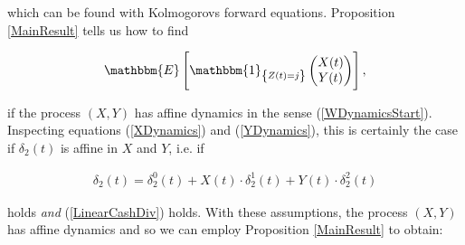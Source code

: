\documentclass{article}
\newcommand{\1}[1]{\mathbbm{1}_{\left\lbrace #1 \right\rbrace}}
\newcommand{\expec}[1][def]{\mathbbm{E} \left[ #1 \right]}
\theoremstyle{break}
\theoremstyle{remark}
\numberwithin{equation}{section}
\begin{document}
which can be found with Kolmogorovs forward equations. Proposition \ref{MainResult} tells us how to find

\begin{align*}
\expec[\1{Z(t)=j}\begin{pmatrix}X(t) \\ Y(t)\end{pmatrix}],
\end{align*}

if the process $(X,Y)$ has affine dynamics in the sense (\ref{WDynamicsStart}). Inspecting equations (\ref{XDynamics}) and (\ref{YDynamics}), this is certainly the case if $\delta_2(t)$ is affine in $X$ and $Y$, i.e. if

\begin{align} \label{LinearBenDiv}
	\delta_2(t) = \delta_2^0(t) + X(t) \cdot \delta_2^1(t) + Y(t) \cdot \delta_2^2(t)
\end{align}

holds \textit{and} (\ref{LinearCashDiv}) holds. With these assumptions, the process $(X,Y)$ has affine dynamics and so we can employ Proposition \ref{MainResult} to obtain:
\end{document}
